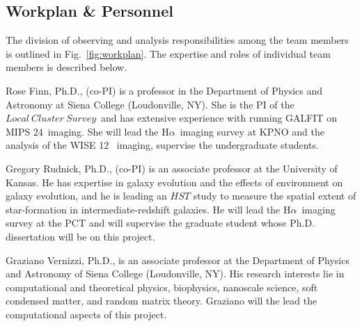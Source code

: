 \documentclass[11pt, preprint]{aastex}
\newcommand{\ha}{H$\alpha$}
\newcommand{\lcs}{$Local \ Cluster \ Survey $}
\begin{document}
{\vspace*{-.9cm}\subsection{Workplan \& Personnel}
\vspace*{-.3cm}


The division of observing and analysis responsibilities among the team
members is outlined in Fig.~\ref{fig:workplan}.   The expertise and
roles of individual team members is described below.

Rose Finn, Ph.D., (co-PI) is a professor in the Department of Physics
and Astronomy at Siena College (Loudonville, NY).  She is the PI of
the \lcs \ and has extensive experience with running GALFIT on MIPS
24\micron \ imaging.  She will lead the \ha \ imaging survey at KPNO
and the analysis of the WISE 12\micron
\ imaging, supervise the undergraduate students.  %

Gregory Rudnick, Ph.D.,  (co-PI) is an associate professor at the University of
Kansas.  He has expertise in galaxy evolution and the effects of environment on galaxy evolution, and he is leading an
$HST$ study to measure the spatial extent of star-formation in
intermediate-redshift galaxies.  He will lead the \ha \ imaging survey
at the PCT and will supervise the graduate student whose Ph.D. dissertation will be on this project.


Graziano Vernizzi, Ph.D., is an associate professor at the Department of
Physics and Astronomy of Siena College (Loudonville, NY).
His research interests lie in computational and theoretical
physics, biophysics, nanoscale science, soft condensed matter, and
random matrix theory. 
Graziano will the lead the computational
aspects of this project.



}
\end{document}
